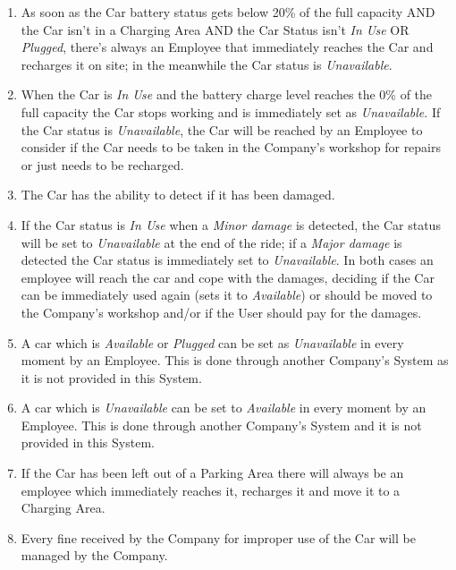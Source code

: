 \begin{enumerate}
	\item As soon as the Car battery status gets below 20\% of the full capacity AND the Car isn't in a Charging Area AND the Car Status isn't \textit{In Use} OR \textit{Plugged}, there's always an Employee that immediately reaches the Car and recharges it on site; in the meanwhile the Car status is \textit{Unavailable}.	
	\item When the Car is \textit{In Use} and the battery charge level reaches the 0\% of the full capacity the Car stops working and is immediately set as \textit{Unavailable}.
	If the Car status is \textit{Unavailable}, the Car will be reached by an Employee to consider if the Car needs to be taken in the Company's workshop for repairs or just needs to be recharged.
	\item The Car has the ability to detect if it has been damaged. 
	\item If the Car status is \textit{In Use} when a \textit{Minor damage} is detected, the Car status will be set to \textit{Unavailable} at the end of the ride; if a \textit{Major damage} is detected the Car status is immediately set to \textit{Unavailable}. In both cases an employee will reach the car and cope with the damages, deciding if the Car can be immediately used again (sets it to \textit{Available}) or should be moved to the Company's workshop and/or if the User should pay for the damages. 
	\item A car which is \textit{Available} or \textit{Plugged} can be set as \textit{Unavailable} in every moment by an Employee. This is done through another Company's System as it is not provided in this System.
	\item A car which is \textit{Unavailable} can be set to \textit{Available} in every moment by an Employee.  This is done through another Company's System and it is not provided in this System.
	\item If the Car has been left out of a Parking Area there will always be an employee which immediately reaches it, recharges it and move it to a Charging Area. 
	\item Every fine received by the Company for improper use of the Car will be managed by the Company.
	
\end{enumerate}

\clearpage